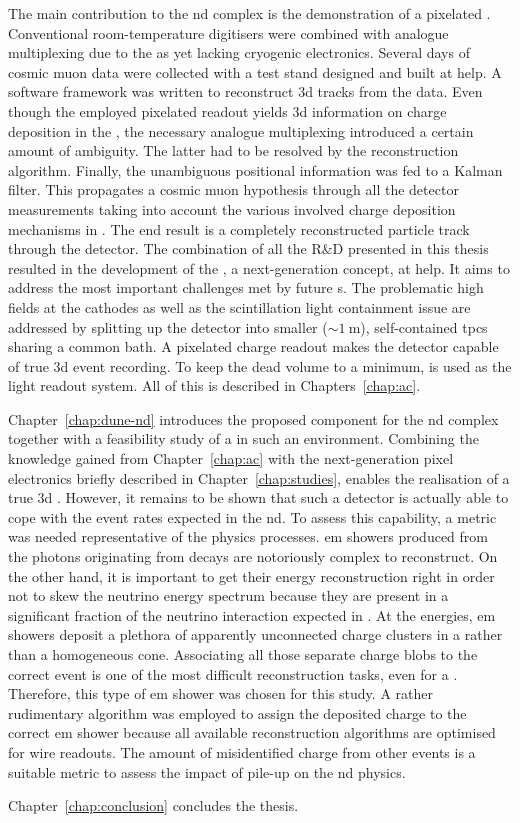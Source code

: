 The main contribution to the \dune{} \gls{nd} complex is the demonstration of a pixelated \lartpc{}.
Conventional room-temperature digitisers were combined with analogue multiplexing due to the as yet lacking cryogenic electronics.
Several days of cosmic muon data were collected with a test stand designed and built at \gls{help}.
A software framework was written to reconstruct \gls{3d} tracks from the data.
Even though the employed pixelated readout yields \gls{3d} information on charge deposition in the \lartpc{}, the necessary analogue multiplexing introduced a certain amount of ambiguity.
The latter had to be resolved by the reconstruction algorithm.
Finally, the unambiguous positional information was fed to a Kalman filter.
This propagates a cosmic muon hypothesis through all the detector measurements taking into account the various involved charge deposition mechanisms in \lar{}.
The end result is a completely reconstructed particle track through the detector.
The combination of all the R\&D presented in this thesis resulted in the development of the \AC{}, a next-generation \lartpc{} concept, at \gls{help}.
It aims to address the most important challenges met by future \lartpc{}s.
The problematic high fields at the cathodes as well as the scintillation light containment issue are addressed by splitting up the detector into smaller ($\sim{\SI{1}{\metre}}$), self-contained \glspl{tpc} sharing a common \lar{} bath.
A pixelated charge readout makes the detector capable of true \gls{3d} event recording.
To keep the dead volume to a minimum, \AL{} is used as the light readout system.
All of this is described in Chapters~\ref{chap:ac}.

Chapter~\ref{chap:dune-nd} introduces the proposed \AC{} \lartpc{} component for the \dune{} \gls{nd} complex together with a feasibility study of a \lartpc{} in such an environment.
Combining the knowledge gained from Chapter~\ref{chap:ac} with the next-generation pixel electronics briefly described in Chapter~\ref{chap:studies}, enables the realisation of a true \gls{3d} \lartpc{}.
However, it remains to be shown that such a detector is actually able to cope with the event rates expected in the \gls{nd}.
To assess this capability, a metric was needed representative of the physics processes.
\gls{em} showers produced from the photons originating from \Pgpz decays are notoriously complex to reconstruct.
On the other hand, it is important to get their energy reconstruction right in order not to skew the neutrino energy spectrum because they are present in a significant fraction of the neutrino interaction expected in \dune{}.
At the \dune{} energies, \gls{em} showers deposit a plethora of apparently unconnected charge clusters in a \lartpc{} rather than a homogeneous cone.
Associating all those separate charge blobs to the correct event is one of the most difficult reconstruction tasks, even for a \lartpc{}.
Therefore, this type of \gls{em} shower was chosen for this study.
A rather rudimentary algorithm was employed to assign the deposited charge to the correct \gls{em} shower because all available \lartpc{} reconstruction algorithms are optimised for wire readouts.
The amount of misidentified charge from other events is a suitable metric to assess the impact of pile-up on the \gls{nd} physics.

Chapter~\ref{chap:conclusion} concludes the thesis.
